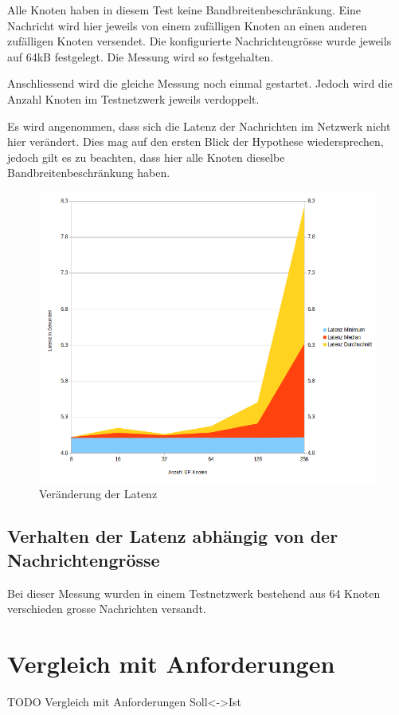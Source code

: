 Alle Knoten haben in diesem Test keine Bandbreitenbeschränkung.
Eine Nachricht wird hier jeweils von einem zufälligen Knoten an einen anderen zufälligen Knoten versendet.
Die konfigurierte Nachrichtengrösse wurde jeweils auf 64kB festgelegt.
Die Messung wird so festgehalten.

Anschliessend wird die gleiche Messung noch einmal gestartet.
Jedoch wird die Anzahl Knoten im Testnetzwerk jeweils verdoppelt.

Es wird angenommen, dass sich die Latenz der Nachrichten im Netzwerk nicht hier verändert.
Dies mag auf den ersten Blick der Hypothese wiedersprechen, jedoch gilt es zu beachten, dass hier alle Knoten dieselbe Bandbreitenbeschränkung haben.

\begin{figure}[htp]
  \includegraphics[width=1.1\textwidth]{img/auswertung-latenz.png}
  \caption{Veränderung der Latenz}\label{fig:auswertung-latenz}
\end{figure}


\subsection{Verhalten der Latenz abhängig von der Nachrichtengrösse}

Bei dieser Messung wurden in einem Testnetzwerk bestehend aus 64 Knoten verschieden grosse Nachrichten versandt.

\section{Vergleich mit Anforderungen}
\label{sec:VergleichAnforderungen}
TODO Vergleich mit Anforderungen Soll<->Ist

